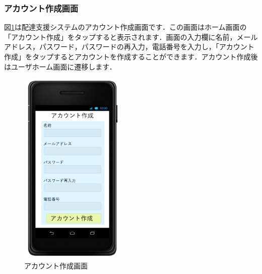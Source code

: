 \documentclass[a4j,titlepage]{jarticle}
\begin{document}
\subsubsection{アカウント作成画面}
図\ref{fig:account_create}は配達支援システムのアカウント作成画面です．この画面はホーム画面の「アカウント作成」をタップすると表示されます．画面の入力欄に名前，メールアドレス，パスワード，パスワードの再入力，電話番号を入力し，「アカウント作成」をタップするとアカウントを作成することができます．アカウント作成後はユーザホーム画面に遷移します．

\begin{figure}[htbp]
 \begin{center}
  \includegraphics[width=50mm]{account_create}
	\caption{アカウント作成画面}
	\label{fig:account_create}
 \end{center}

\end{figure}
\end{document}
